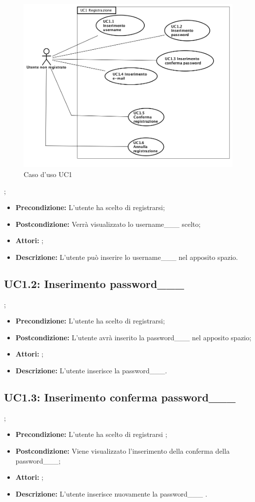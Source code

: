 \begin{figure}[h]
	\begin{center}
	\includegraphics[scale=0.4]{diagram/UC1.png}
	\caption{Caso d'uso UC1}
	\end{center}
\end{figure};
\begin{itemize}
	\item \textbf{Precondizione:} L'utente ha scelto di registrarsi;
	\item \textbf{Postcondizione:} Verrà visualizzato lo username___ scelto;
	\item \textbf{Attori:} ;
	\item \textbf{Descrizione:} L'utente può inserire lo username___ nel apposito spazio.
\end{itemize}
\subsection{ UC1.2: Inserimento password___}
;
\begin{itemize}
	\item \textbf{Precondizione:} L'utente ha scelto di registrarsi;
	\item \textbf{Postcondizione:} L'utente avrà inserito la password___ nel apposito spazio;
	\item \textbf{Attori:} ;
	\item \textbf{Descrizione:} L'utente inserisce la password___.
\end{itemize}
\subsection{ UC1.3: Inserimento conferma password___}
;
\begin{itemize}
	\item \textbf{Precondizione:} L'utente ha scelto di registrarsi ;
	\item \textbf{Postcondizione:} Viene visualizzato l'inserimento della conferma della password___;
	\item \textbf{Attori:} ;
	\item \textbf{Descrizione:} L'utente inserisce nuovamente la password___ .
\end{itemize}
